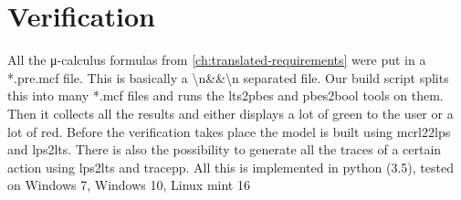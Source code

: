 \documentclass[final]{report}
\begin{document}
\chapter{Verification}
\label{ch:verification}
All the μ-calculus formulas from \cref{ch:translated-requirements} were put in a *.pre.mcf file.
This is basically a \textbackslash n\&\&\textbackslash n separated file.
Our build script splits this into many *.mcf files and runs the lts2pbes and pbes2bool tools on them.
Then it collects all the results and either displays a lot of green to the user or a lot of red.
Before the verification takes place the model is built using mcrl22lps and lps2lts.
There is also the possibility to generate all the traces of a certain action using lps2lts and tracepp.
All this is implemented in python (3.5), tested on Windows 7, Windows 10, Linux mint 16
\end{document}
